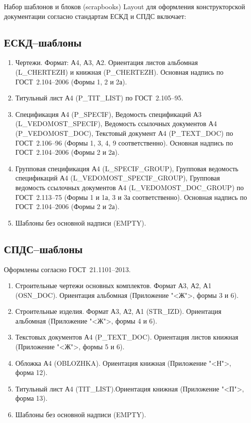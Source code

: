 \documentclass[14pt]{extreport}
\begin{document}
Набор шаблонов и блоков (scrapbooks) Layout для оформления конструкторской документации согласно стандартам ЕСКД и СПДС включает:

\subsection{ЕСКД--шаблоны}
\begin{enumerate}
	\item Чертежи. Формат: А4, А3, А2. Ориентация листов альбомная (\textsf{L\_CHERTEZH}) и книжная (\textsf{P\_CHERTEZH}). Основная надпись по ГОСТ~2.104--2006 (Формы 1, 2 и 2а).
	\item Титульный лист А4 (\textsf{P\_TIT\_LIST}) по ГОСТ~2.105--95.
	\item Спецификация А4 (\textsf{P\_SPECIF}), Ведомость спецификаций А3 (\textsf{L\_VEDOMOST\_SPECIF}), Ведомость ссылочных документов А4 (\textsf{P\_VEDOMOST\_DOC}), Текстовый документ А4 (\textsf{P\_TEXT\_DOC}) по ГОСТ~2.106--96 (Формы 1, 3, 4, 9 соответственно). Основная надпись по ГОСТ~2.104--2006 (Формы 2 и 2а).
	\item Групповая спецификация А4 (\textsf{L\_SPECIF\_GROUP}), Групповая ведомость спецификаций А4  (\textsf{L\_VEDOMOST\_SPECIF\_GROUP}), Групповая ведомость ссылочных документов А4 (\textsf{L\_VEDOMOST\_DOC\_GROUP}) по ГОСТ~2.113--75 (Формы 1 и 1а, 3 и 3а соответственно).  Основная надпись по ГОСТ~2.104--2006 (Формы 2 и 2а).
	\item Шаблоны без основной надписи (\textsf{EMPTY}).
\end{enumerate}
\subsection{СПДС--шаблоны}

Оформлены согласно ГОСТ~21.1101--2013.
\begin{enumerate}
	\item Строительные чертежи основных комплектов. Формат А3, А2, А1 (\textsf{OSN\_DOC}). Ориентация альбомная (Приложение "<Ж">, формы 3 и 6).
	\item Строительные изделия. Формат А3, А2, А1 (\textsf{STR\_IZD}). Ориентация альбомная (Приложение "<Ж">, формы 4 и 6).
	\item Текстовых документов А4 (\textsf{P\_TEXT\_DOC}). Ориентация листов книжная (Приложение "<Ж">, формы 5 и 6).
	\item Обложка А4 (\textsf{OBLOZHKA}). Ориентация книжная (Приложение "<Н">, форма 12).
	\item Титульный лист А4 (\textsf{TIT\_LIST}).Ориентация книжная (Приложение "<П">, форма 13).
	\item Шаблоны без основной надписи (\textsf{EMPTY}).
\end{enumerate}
\end{document}
